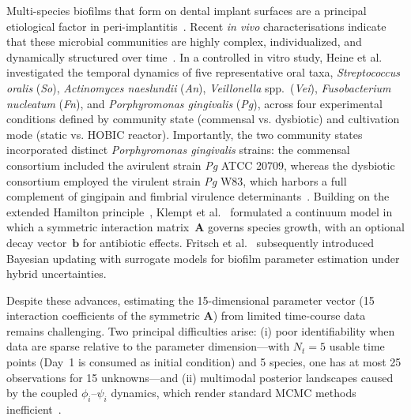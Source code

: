 \documentclass[11pt,a4paper]{article}
\begin{document}
Multi-species biofilms that form on dental implant surfaces are a principal etiological factor in peri-implantitis~\cite{Kolenbrander2010OralMultispecies, Marsh2003Dental}. Recent \textit{in vivo} characterisations indicate that these microbial communities are highly complex, individualized, and dynamically structured over time~\cite{EarlyImplantBiofilm2024, PeriImplantitisDysbiosis2025}.
In a controlled in vitro study, Heine et al.~\cite{Heine2025PeriImplant} investigated the temporal dynamics of five representative oral taxa, \textit{Streptococcus oralis} (\textit{So}), \textit{Actinomyces naeslundii} (\textit{An}), \textit{Veillonella} spp.\ (\textit{Vei}), \textit{Fusobacterium nucleatum} (\textit{Fn}), and \textit{Porphyromonas gingivalis} (\textit{Pg}), across four experimental conditions defined by community state (commensal vs. dysbiotic) and cultivation mode (static vs. HOBIC reactor).
Importantly, the two community states incorporated distinct \textit{Porphyromonas gingivalis} strains: the commensal consortium included the avirulent strain \textit{Pg} ATCC 20709, whereas the dysbiotic consortium employed the virulent strain \textit{Pg} W83, which harbors a full complement of gingipain and fimbrial virulence determinants~\cite{Heine2025PeriImplant}.
Building on the extended Hamilton principle~\cite{JunkerBalzani2021ExtendedHamilton}, Klempt et al.~\cite{Klempt2025ContinuumBiofilm} formulated a continuum model in which a symmetric interaction matrix~$\mathbf{A}$ governs species growth, with an optional decay vector~$\mathbf{b}$ for antibiotic effects.
Fritsch et al.~\cite{Fritsch2025BayesianMicrofilms} subsequently introduced Bayesian updating with surrogate models for biofilm parameter estimation under hybrid uncertainties.

Despite these advances, estimating the 15-dimensional parameter vector (15 interaction coefficients of the symmetric $\mathbf{A}$) from limited time-course data remains challenging.
Two principal difficulties arise: (i) poor identifiability when data are sparse relative to the parameter dimension---with $N_t=5$ usable time points (Day~1 is consumed as initial condition) and 5 species, one has at most 25 observations for 15 unknowns---and (ii) multimodal posterior landscapes caused by the coupled $\phi_i$--$\psi_i$ dynamics, which render standard MCMC methods inefficient~\cite{RobertCasella2004MonteCarlo}.
\end{document}
